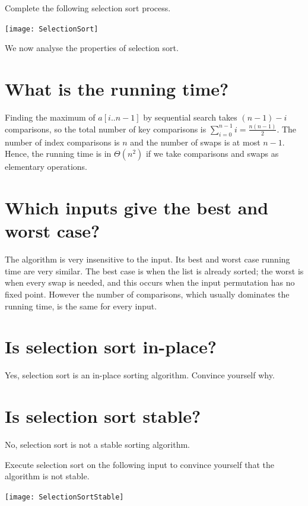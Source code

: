 \begin{Boxample}[0]
Complete the following selection sort process.
\begin{center}
\texttt{[image: SelectionSort]}
\end{center}
\end{Boxample}

We now analyse the properties of selection sort.

\section{What is the running time?}
Finding the maximum of $a[i..n-1]$ by sequential search takes $(n - 1) - i$ comparisons, 
so the total number of key comparisons is $\sum_{i=0}^{n-1} i  = \frac{n(n - 1)}{2}$.
The number of index comparisons is $n$ and the number of swaps is at most $n - 1$.
Hence, the running time is in $\Theta(n^2)$ if we take comparisons and swaps as elementary operations.

\section{Which inputs give the best and worst case?}
The algorithm is very insensitive to the input. 
Its best and worst case running time are very similar. 
The best case is when the list is already sorted; the worst is when every swap is needed, 
and this occurs when the input permutation has no fixed point. 
However the number of comparisons, which usually dominates the running time, is the same for every input.

\section{Is selection sort in-place?}
Yes, selection sort is an in-place sorting algorithm. Convince yourself why.

\section{Is selection sort stable?}
No, selection sort is not a stable sorting algorithm.
\begin{Boxample}[0]
Execute selection sort on the following input to convince yourself that the algorithm is not stable.
\begin{center}
\texttt{[image: SelectionSortStable]} 
\end{center}
\end{Boxample}

